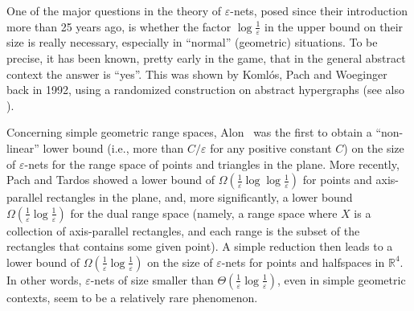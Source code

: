 \documentclass[12pt]{article}
\newcommand{\eps}{{\varepsilon}}
\newcommand{\reals}{{\mathbb R}}
\providecommand{\Komlos}{Koml\'os\xspace}
\begin{document}
One of the major questions in the theory of $\eps$-nets, posed since
their introduction more than 25 years ago, is whether the factor
$\log\frac{1}{\eps}$ in the upper bound on their size is really
necessary, especially in ``normal'' (geometric) situations. To be
precise, it has been known, pretty early in the game, that in the
general abstract context the answer is ``yes''. This was shown by
\Komlos, Pach and Woeginger~\cite{kpw-atben-92} back in 1992, using a
randomized construction on abstract hypergraphs (see also
\cite{pa-cg-95}).

Concerning simple geometric range spaces, Alon~\cite{a-nllbp-12} was
the first to obtain a ``non-linear'' lower bound (i.e., more than 
$C/\eps$ for any positive constant $C$) on the size of $\eps$-nets 
for the range space of points and triangles in the plane. More recently, 
Pach and Tardos \cite{pt-tlbse-13} showed a lower bound of 
$\Omega(\tfrac{1}{\eps}\log \log \tfrac{1}{\eps})$ for points and axis-parallel
rectangles in the plane, and, more significantly, a lower bound
$\Omega( \tfrac{1}{\eps}\log \tfrac{1}{\eps})$ for the dual range space 
(namely, a range space where $X$ is a collection of axis-parallel rectangles, 
and each range is the subset of the rectangles that contains some given point).
A simple reduction then leads to a lower bound of 
$\Omega( \tfrac{1}{\eps}\log \tfrac{1}{\eps})$ on the size 
of $\eps$-nets for points and halfspaces in $\reals^4$. 
In other words, $\eps$-nets of size smaller than
$\Theta( \tfrac{1}{\eps}\log \tfrac{1}{\eps})$, even in simple geometric
contexts, seem to be a relatively rare phenomenon.
\end{document}
